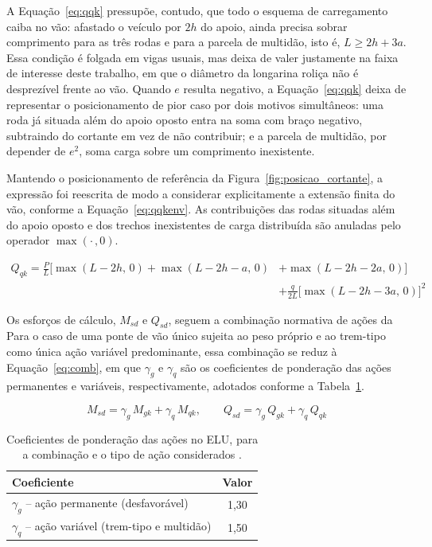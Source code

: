 A Equação~\eqref{eq:qqk} pressupõe, contudo, que todo o esquema de carregamento caiba no vão: afastado o veículo por $2h$ do apoio, ainda precisa sobrar comprimento para as três rodas e para a parcela de multidão, isto é, $L \geq 2h + 3a$. Essa condição é folgada em vigas usuais, mas deixa de valer justamente na faixa de interesse deste trabalho, em que o diâmetro da longarina roliça não é desprezível frente ao vão. Quando $e$ resulta negativo, a Equação~\eqref{eq:qqk} deixa de representar o posicionamento de pior caso por dois motivos simultâneos: uma roda já situada além do apoio oposto entra na soma com braço negativo, subtraindo do cortante em vez de não contribuir; e a parcela de multidão, por depender de $e^2$, soma carga sobre um comprimento inexistente.

Mantendo o posicionamento de referência da Figura~\ref{fig:posicao_cortante}, a expressão foi reescrita de modo a considerar explicitamente a extensão finita do vão, conforme a Equação~\eqref{eq:qqkenv}. As contribuições das rodas situadas além do apoio oposto e dos trechos inexistentes de carga distribuída são anuladas pelo operador $\max(\cdot\,,0)$.

\begin{equation}
\begin{split}
Q_{qk} = \frac{P}{L}\Big[\max(L-2h,\,0) + \max(L-2h-a,\,0) &+ \max(L-2h-2a,\,0)\Big] \\
&+ \frac{q}{2L}\Big[\max(L-2h-3a,\,0)\Big]^{2}
\end{split}
\label{eq:qqkenv}
\end{equation}

Os esforços de cálculo, $M_{sd}$ e $Q_{sd}$, seguem a combinação normativa de ações da \textcite{NBR8681:2025}
Para o caso de uma ponte de vão único sujeita ao peso próprio e ao trem-tipo como única ação variável predominante, essa combinação se reduz à Equação~\eqref{eq:comb}, em que $\gamma_g$ e $\gamma_q$ são os coeficientes de ponderação das ações permanentes e variáveis, respectivamente, adotados conforme a Tabela~\ref{tab:ponderadores_acoes}.

\begin{equation}
M_{sd} = \gamma_g\,M_{gk} + \gamma_q\,M_{qk}, \qquad Q_{sd} = \gamma_g\,Q_{gk} + \gamma_q\,Q_{qk}
\label{eq:comb}
\end{equation}

\begin{table}[htpb!]
\centering
\caption{Coeficientes de ponderação das ações no ELU, para a combinação e o tipo de ação considerados \parencite{NBR8681:2025}.}
\label{tab:ponderadores_acoes}
\footnotesize
\begin{tabular}{lc}
\hline
\textbf{Coeficiente} & \textbf{Valor} \\
\hline
$\gamma_g$ -- ação permanente (desfavorável) & 1,30 \\
$\gamma_q$ -- ação variável (trem-tipo e multidão) & 1,50 \\
\hline
\end{tabular}
\end{table}

